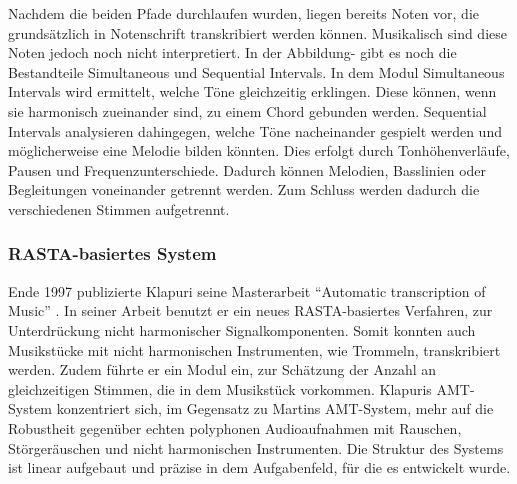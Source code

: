 Nachdem die beiden Pfade durchlaufen wurden, liegen bereits Noten vor,
die grundsätzlich in Notenschrift transkribiert werden können.
Musikalisch sind diese Noten jedoch noch nicht interpretiert.
In der Abbildung- gibt es noch die Bestandteile Simultaneous und Sequential Intervals.
In dem Modul Simultaneous Intervals wird ermittelt, welche Töne gleichzeitig erklingen.
Diese können, wenn sie harmonisch zueinander sind, zu einem Chord gebunden werden.
Sequential Intervals analysieren dahingegen, welche Töne nacheinander gespielt werden und
möglicherweise eine Melodie bilden könnten.
Dies erfolgt durch Tonhöhenverläufe, Pausen und Frequenzunterschiede.
Dadurch können Melodien, Basslinien oder Begleitungen voneinander getrennt werden.
Zum Schluss werden dadurch die verschiedenen Stimmen aufgetrennt.

\subsubsection{RASTA-basiertes System}
Ende 1997 publizierte Klapuri seine Masterarbeit \enquote{Automatic transcription of Music} \cite{klapuri1998automatic}.
In seiner Arbeit benutzt er ein neues RASTA-basiertes Verfahren, zur Unterdrückung nicht harmonischer Signalkomponenten.
Somit konnten auch Musikstücke mit nicht harmonischen Instrumenten, wie Trommeln, transkribiert werden.
Zudem führte er ein Modul ein, zur Schätzung der Anzahl an gleichzeitigen Stimmen, die in dem Musikstück vorkommen.
Klapuris AMT-System konzentriert sich, im Gegensatz zu Martins AMT-System, mehr auf die Robustheit gegenüber
echten polyphonen Audioaufnahmen mit Rauschen, Störgeräuschen und nicht harmonischen Instrumenten.
Die Struktur des Systems ist linear aufgebaut und präzise in dem Aufgabenfeld, für die es entwickelt wurde.

